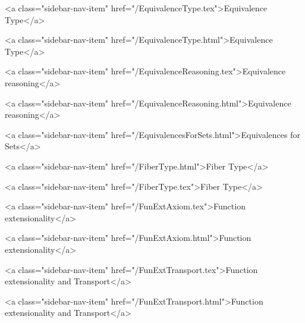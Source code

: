       
    
      
        
          <a class="sidebar-nav-item" href="/EquivalenceType.tex">Equivalence Type</a>
        
      
    
      
        
          <a class="sidebar-nav-item" href="/EquivalenceType.html">Equivalence Type</a>
        
      
    
      
        
          <a class="sidebar-nav-item" href="/EquivalenceReasoning.tex">Equivalence reasoning</a>
        
      
    
      
        
          <a class="sidebar-nav-item" href="/EquivalenceReasoning.html">Equivalence reasoning</a>
        
      
    
      
        
          <a class="sidebar-nav-item" href="/EquivalencesForSets.html">Equivalences for Sets</a>
        
      
    
      
        
          <a class="sidebar-nav-item" href="/FiberType.html">Fiber Type</a>
        
      
    
      
        
          <a class="sidebar-nav-item" href="/FiberType.tex">Fiber Type</a>
        
      
    
      
        
          <a class="sidebar-nav-item" href="/FunExtAxiom.tex">Function extensionality</a>
        
      
    
      
        
          <a class="sidebar-nav-item" href="/FunExtAxiom.html">Function extensionality</a>
        
      
    
      
        
          <a class="sidebar-nav-item" href="/FunExtTransport.tex">Function extensionality and Transport</a>
        
      
    
      
        
          <a class="sidebar-nav-item" href="/FunExtTransport.html">Function extensionality and Transport</a>
        
